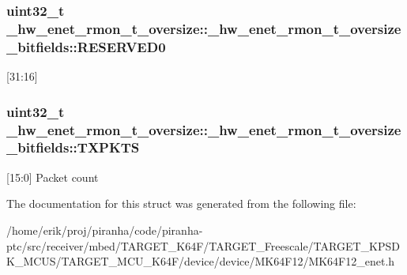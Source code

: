 \subsubsection[{\texorpdfstring{R\+E\+S\+E\+R\+V\+E\+D0}{RESERVED0}}]{\setlength{\rightskip}{0pt plus 5cm}uint32\+\_\+t \+\_\+hw\+\_\+enet\+\_\+rmon\+\_\+t\+\_\+oversize\+::\+\_\+hw\+\_\+enet\+\_\+rmon\+\_\+t\+\_\+oversize\+\_\+bitfields\+::\+R\+E\+S\+E\+R\+V\+E\+D0}\hypertarget{struct__hw__enet__rmon__t__oversize_1_1__hw__enet__rmon__t__oversize__bitfields_a6488f38a02023a27cc8213e202ea3ccb}{}\label{struct__hw__enet__rmon__t__oversize_1_1__hw__enet__rmon__t__oversize__bitfields_a6488f38a02023a27cc8213e202ea3ccb}
\mbox{[}31\+:16\mbox{]} 
\subsubsection[{\texorpdfstring{T\+X\+P\+K\+TS}{TXPKTS}}]{\setlength{\rightskip}{0pt plus 5cm}uint32\+\_\+t \+\_\+hw\+\_\+enet\+\_\+rmon\+\_\+t\+\_\+oversize\+::\+\_\+hw\+\_\+enet\+\_\+rmon\+\_\+t\+\_\+oversize\+\_\+bitfields\+::\+T\+X\+P\+K\+TS}\hypertarget{struct__hw__enet__rmon__t__oversize_1_1__hw__enet__rmon__t__oversize__bitfields_aef2c6dab8742c3ad438cc1cff0973243}{}\label{struct__hw__enet__rmon__t__oversize_1_1__hw__enet__rmon__t__oversize__bitfields_aef2c6dab8742c3ad438cc1cff0973243}
\mbox{[}15\+:0\mbox{]} Packet count 

The documentation for this struct was generated from the following file\+:\begin{DoxyCompactItemize}
\item 
/home/erik/proj/piranha/code/piranha-\/ptc/src/receiver/mbed/\+T\+A\+R\+G\+E\+T\+\_\+\+K64\+F/\+T\+A\+R\+G\+E\+T\+\_\+\+Freescale/\+T\+A\+R\+G\+E\+T\+\_\+\+K\+P\+S\+D\+K\+\_\+\+M\+C\+U\+S/\+T\+A\+R\+G\+E\+T\+\_\+\+M\+C\+U\+\_\+\+K64\+F/device/device/\+M\+K64\+F12/M\+K64\+F12\+\_\+enet.\+h\end{DoxyCompactItemize}
